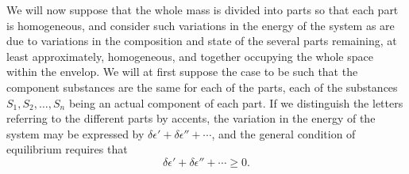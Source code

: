 \documentclass[11pt]{article}
\newcommand{\eps}{\epsilon}
\begin{document}
We will now suppose that the whole mass is divided into parts so that each part is homogeneous, and consider such variations in the energy of the system as are due to variations in the composition and state of the several parts remaining, at least approximately, homogeneous, and together occupying the whole space within the envelop. We will at first suppose the case to be such that the component substances are the same for each of the parts, each of the substances \(S_1,S_2,\ldots,S_n\) being an actual component of each part. If we distinguish the letters referring to the different parts by accents, the variation in the energy of the system may be expressed by \(\delta\eps' + \delta\eps'' + \cdots\), and the general condition of equilibrium requires that
\begin{equation}
\delta\eps' + \delta\eps'' + \cdots \geq 0.
\end{equation}
\end{document}
